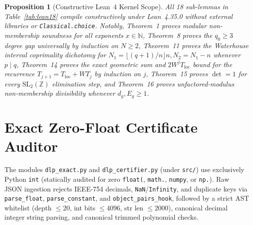 \documentclass[10pt,twocolumn]{article}
\newtheorem{proposition}{Proposition}
\newcommand{\ZZ}{\mathbb{Z}}
\newcommand{\NN}{\mathbb{N}}
\begin{document}
\begin{proposition}[Constructive Lean~4 Kernel Scope]\label{prop:lean}
\normalfont All 18 sub-lemmas in Table~\ref{tab:lean18} compile constructively under Lean~4.35.0 without external libraries or \texttt{Classical.choice}. Notably, Theorem~1 proves modular non-membership soundness for all exponents $x\in\NN$, Theorem~8 proves the $q_0\ge 3$ degree gap universally by induction on $N\ge 2$, Theorem~11 proves the Waterhouse interval coprimality dichotomy for $N_1=\lfloor(q+1)/n\rfloor n, N_2=N_1-n$ whenever $p\mid q$, Theorem~14 proves the exact geometric sum and $2W^j T_{\mathrm{loc}}$ bound for the recurrence $T_{j+1}=T_{\mathrm{loc}}+W T_j$ by induction on $j$, Theorem~15 proves $\det=1$ for every $\mathrm{SL}_2(\ZZ)$ elimination step, and Theorem~16 proves unfactored-modulus non-membership divisibility whenever $d_g,E_g\ge 1$.
\end{proposition}

\section{Exact Zero-Float Certificate Auditor}\label{sec:certifier}
The modules \nolinkurl{dlp_exact.py} and \nolinkurl{dlp_certifier.py} (under \texttt{src/}) use exclusively Python \texttt{int} (statically audited for zero \texttt{float(}, \texttt{math.}, \texttt{numpy}, or \texttt{np.}). Raw JSON ingestion rejects IEEE-754 decimals, \texttt{NaN}/\texttt{Infinity}, and duplicate keys via \nolinkurl{parse_float}, \nolinkurl{parse_constant}, and \nolinkurl{object_pairs_hook}, followed by a strict AST whitelist (depth $\le 20$, int bits $\le 4096$, str len $\le 2000$), canonical decimal integer string parsing, and canonical trimmed polynomial checks.
\end{document}
